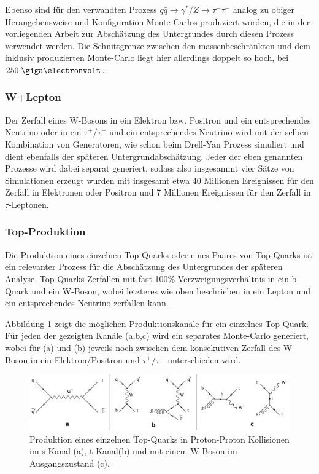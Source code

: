 Ebenso sind für den verwandten Prozess
$q\bar q \rightarrow \gamma^*/Z \rightarrow \tau^+\tau^-$ analog zu obiger 
Herangehensweise und Konfiguration Monte-Carlos produziert worden, die in
der vorliegenden Arbeit zur Abschätzung des Untergrundes durch diesen Prozess
verwendet werden. Die Schnittgrenze zwischen den massenbeschränkten und dem
inklusiv produzierten Monte-Carlo liegt hier allerdings doppelt so hoch, bei
$250 \GeV$.

\subsubsection*{W+Lepton}
Der Zerfall eines W-Bosons in ein Elektron bzw. Positron und ein entsprechendes
Neutrino oder in ein $\tau^+/\tau^-$ und ein entsprechendes Neutrino wird mit
der selben Kombination von Generatoren, wie schon beim Drell-Yan Prozess
simuliert und dient ebenfalls der späteren Untergrundabschätzung. Jeder der
eben genannten Prozesse wird dabei separat generiert, sodass also insgesammt
vier Sätze von Simulationen erzeugt wurden mit insgesamt etwa 40 Millionen
Ereignissen für den Zerfall in Elektronen oder Positron und 7 Millionen
Ereignissen für den Zerfall in $\tau$-Leptonen.

\subsubsection*{Top-Produktion}
Die Produktion eines einzelnen Top-Quarks oder eines Paares von Top-Quarks ist
ein relevanter Prozess für die Abschätzung des Untergrundes der späteren
Analyse. Top-Quarks Zerfallen mit fast 100\% Verzweigungsverhältnis in ein
b-Quark und ein W-Boson, wobei letzteres wie oben beschrieben in ein Lepton
und ein entsprechendes Neutrino zerfallen kann.

Abbildung \ref{fig:singletop} zeigt die möglichen Produktionskanäle für ein
einzelnes Top-Quark. Für jeden der gezeigten Kanäle (a,b,c) wird ein separates
Monte-Carlo generiert, wobei für (a) und (b) jeweils noch zwischen dem
konsekutiven Zerfall des W-Boson in ein Elektron/Positron und $\tau^+/\tau^-$
unterschieden wird.

\begin{figure}
    \centering
    \includegraphics[width=1.\textwidth]{img/singletop}
    \caption[Produktionskanäle für ein einzelnes Top-Quark in Proton-Proton
        Kollisionen]
        {Produktion eines einzelnen Top-Quarks in Proton-Proton Kollisionen im
        s-Kanal (a), t-Kanal(b) und mit einem W-Boson im Ausgangszustand (c).}
    \label{fig:singletop}
\end{figure}

